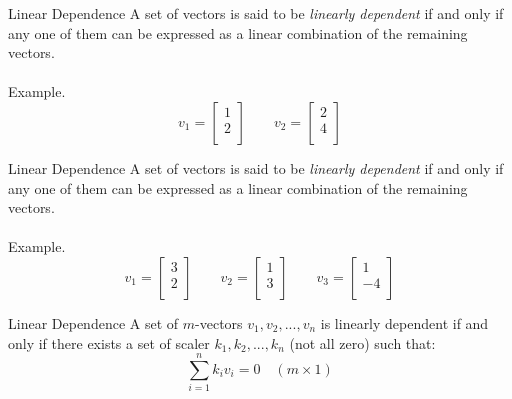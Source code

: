 \documentclass{./../../Latex/teaching_slides}
\begin{document}
\begin{frame}{Linear Dependence}
A set of vectors is said to be \textit{linearly dependent} if and only if any one of them can be expressed as a linear combination of the remaining vectors. \\~\\
Example.$$ v_1 =  \begin{bmatrix}
1\\
2 \\
\end{bmatrix} \quad \quad v_2 = \begin{bmatrix}
2\\
4 \\
\end{bmatrix}$$
\end{frame}

\begin{frame}{Linear Dependence}
A set of vectors is said to be \textit{linearly dependent} if and only if any one of them can be expressed as a linear combination of the remaining vectors. \\~\\
Example.$$ v_1 =  \begin{bmatrix}
3\\
2 \\
\end{bmatrix} \quad \quad v_2 = \begin{bmatrix}
1\\
3 \\
\end{bmatrix} \quad \quad v_3 = \begin{bmatrix}
1\\
-4 \\
\end{bmatrix} $$
\end{frame}

\begin{frame}{Linear Dependence}
A set of $m$-vectors $v_1, v_2, ...,v_n$ is linearly dependent if and only if there exists a set of scaler $k_1, k_2, ..., k_n$ (not all zero) such that:
$$ \sum_{i=1}^n k_i v_i = 0 \quad (m \times 1) $$
\end{frame}
\end{document}
